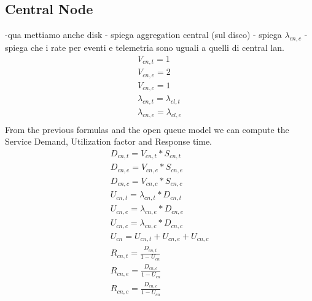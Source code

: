 \documentclass[11pt]{article}
\begin{document}
\subsection{Central Node}
-qua mettiamo anche disk
- spiega aggregation central (sul disco)
- spiega $\lambda_{cn,c}$
- spiega che i rate per eventi e telemetria sono uguali a quelli di central lan.
\begin{equation}
	\begin{array}{l}
		V_{cn, t} = 1 \\
		V_{cn, e} = 2 \\ %
		V_{cn,c} = 1 \\
		\lambda_{cn, t} = \lambda_{cl,t} \\
		\lambda_{cn, e} = \lambda_{cl,e} \\
	\end{array}
\end{equation}
From the previous formulas and the open queue model we can compute the Service Demand, Utilization factor and Response time.
\begin{equation}
	\begin{array}{l}
		D_{cn, t} = V_{cn, t} * S_{cn, t} \\
		D_{cn, e} = V_{cn, e} * S_{cn, e} \\
		D_{cn, c} = V_{cn, c} * S_{cn, c} \\
		U_{cn, t} = \lambda_{cn, t} * D_{cn, t} \\
		U_{cn, e} = \lambda_{cn, e} * D_{cn, e} \\
		U_{cn, c} = \lambda_{cn, c} * D_{cn, c} \\
		U_{cn} = U_{cn, t} + U_{cn, e} + U_{cn, c} \\
		R_{cn, t} = \frac{D_{cn, t}}{1 - U_{cn}} \\
		R_{cn, e} = \frac{D_{cn, e}}{1 - U_{cn}} \\
		R_{cn, c} = \frac{D_{cn, c}}{1 - U_{cn}} \\
	\end{array}
\end{equation}
\end{document}
